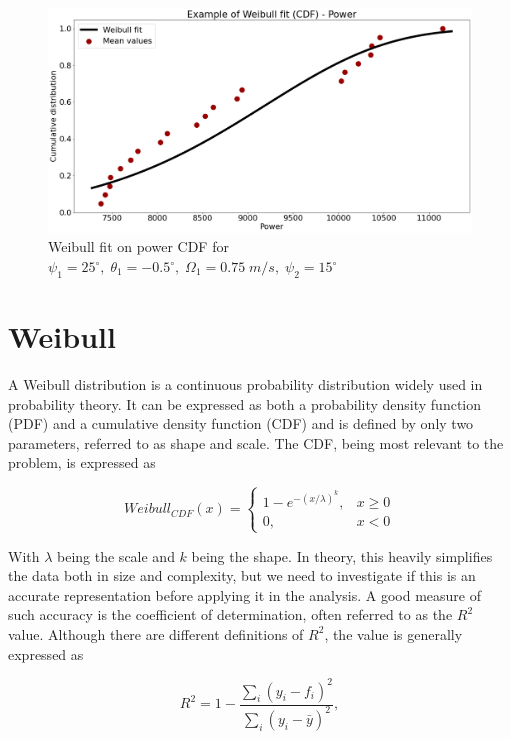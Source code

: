 \begin{figure}[H]
    \centering
    \includegraphics[scale=0.25]{Illustrations/weibullfitexample.png}
    \caption{Weibull fit on power CDF for $\psi_1 = 25^\circ, \; \theta_1 = -0.5^\circ, \; \Omega_1 = 0.75 \; m/s, \; \psi_2 = 15^\circ$}
    \label{fig:weibullexample}
\end{figure}

\section{Weibull}
\label{weibull}

A Weibull distribution is a continuous probability distribution widely used in probability theory. It can be expressed as both a probability density function (PDF) and a cumulative density function (CDF) and is defined by only two parameters, referred to as shape and scale. The CDF, being most relevant to the problem, is expressed as

\begin{equation}
Weibull_{CDF}(x)=\begin{cases}1-e^{-(x / \lambda)^k}, & x \geq 0 \\ 0, & x<0\end{cases}
\end{equation}

With $\lambda$ being the scale and $k$ being the shape. In theory, this heavily simplifies the data both in size and complexity, but we need to investigate if this is an accurate representation before applying it in the analysis. A good measure of such accuracy is the coefficient of determination, often referred to as the $R^2$ value. Although there are different definitions of $R^2$, the value is generally expressed as

\begin{equation}
R^2=1-\frac{\sum_i\left(y_i-f_i\right)^2}{\sum_i\left(y_i-\bar{y}\right)^2},
\end{equation}

